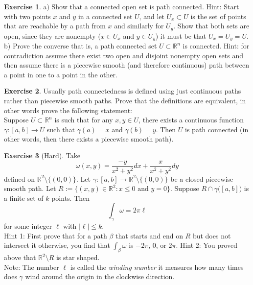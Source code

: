 \documentclass[12pt]{book}
\newcommand{\abs}[1]{\left\lvert {#1} \right\rvert}
\newcommand{\R}{{\mathbb{R}}}
\newcommand{\myindex}[1]{#1\index{#1}}
\theoremstyle{plain}
\theoremstyle{remark}
\theoremstyle{definition}
\theoremstyle{exercise}
\newtheorem{exercise}{Exercise}[section]
\theoremstyle{example}
\begin{document}
\begin{exercise}
a)
Show that a connected open set is path connected.  Hint: Start with two
points $x$ and $y$ in a connected set $U$, and let $U_x \subset U$ is the set of points that are
reachable by a path from $x$ and similarly for $U_y$.  Show that both sets
are open, since they are nonempty ($x \in U_x$ and $y \in U_y$) it must be
that $U_x = U_y = U$.
\\
b) Prove the converse that is, a path connected set $U \subset \R^n$ is
connected.  Hint: for contradiction assume there exist two open and disjoint nonempty open
sets and then assume there is a piecewise smooth (and therefore continuous)
path between a point in one to a point in the other.
\end{exercise}

\begin{exercise}
Usually path connectedness is defined using just continuous paths rather
than piecewise smooth paths.  Prove that the definitions are equivalent, in
other words prove the following statement:\\
Suppose $U \subset \R^n$ is such that for any $x,y \in U$, there exists a continuous function
$\gamma \colon [a,b] \to U$ such that $\gamma(a) = x$ and $\gamma(b) = y$.
Then $U$ is path connected (in other words, then there exists a piecewise
smooth path).
\end{exercise}

\begin{exercise}[Hard]
Take
\begin{equation*}
\omega(x,y) = \frac{-y}{x^2+y^2} dx + \frac{x}{x^2+y^2} dy
\end{equation*}
defined on $\R^2 \setminus \{ (0,0) \}$.  Let $\gamma \colon [a,b] \to \R^2
\setminus \{ (0,0) \}$ be a closed piecewise smooth path.
Let $R:=\{ (x,y) \in \R^2 : x \leq 0 \text{ and } y=0 \}$.
Suppose $R \cap \gamma\bigl([a,b]\bigr)$ is a finite set of $k$ points.  Then
\begin{equation*}
\int_{\gamma} \omega = 2 \pi \ell 
\end{equation*}
for some integer $\ell$ with $\abs{\ell} \leq k$.\\
Hint 1: First prove that for a path $\beta$ that starts and end on $R$ but
does not intersect it otherwise, you find that $\int_{\beta} \omega$
is $-2\pi$, 0, or $2\pi$.
Hint 2: You proved above that $\R^2 \setminus R$ is star shaped.
\\
Note: The number $\ell$ is called the \emph{\myindex{winding number}} it measures how many
times does $\gamma$ wind around the origin in the clockwise direction.
\end{exercise}
\end{document}
